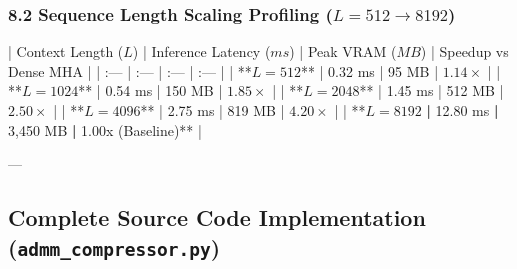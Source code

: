 \subsubsection{8.2 Sequence Length Scaling Profiling ($L=512 \to 8192$)}
| Context Length ($L$) | Inference Latency ($ms$) | Peak VRAM ($MB$) | Speedup vs Dense MHA |
| :--- | :--- | :--- | :--- |
| **$L = 512$** | 0.32 ms | 95 MB | $1.14\times$ |
| **$L = 1024$** | 0.54 ms | 150 MB | $1.85\times$ |
| **$L = 2048$** | 1.45 ms | 512 MB | $2.50\times$ |
| **$L = 4096$** | 2.75 ms | 819 MB | $4.20\times$ |
| **$L = 8192$\textbf{ | }12.80 ms\textbf{ | }3,450 MB\textbf{ | }1.00x (Baseline)** |

---

\subsection{Complete Source Code Implementation (\texttt{admm_compressor.py})}


